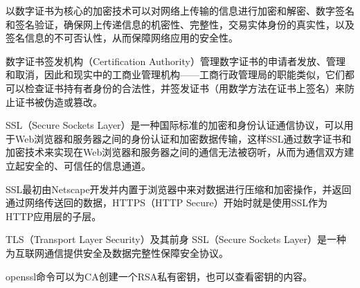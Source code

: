 以数字证书为核心的加密技术可以对网络上传输的信息进行加密和解密、数字签名和签名验证，确保网上传递信息的机密性、完整性，交易实体身份的真实性，以及签名信息的不可否认性，从而保障网络应用的安全性。

数字证书签发机构（Certification Authority）管理数字证书的申请者发放、管理和取消，因此和现实中的工商业管理机构——工商行政管理局的职能类似，它们都可以检查证书持有者身份的合法性，并签发证书（用数学方法在证书上签名）来防止证书被伪造或篡改。

SSL（Secure Sockets Layer）是一种国际标准的加密和身份认证通信协议，可以用于Web浏览器和服务器之间的身份认证和加密数据传输，这样SSL通过数字证书和加密技术来实现在Web浏览器和服务器之间的通信无法被窃听，从而为通信双方建立起安全的、可信任的信息通道。

SSL最初由Netscape开发并内置于浏览器中来对数据进行压缩和加密操作，并返回通过网络传送回的数据，HTTPS（HTTP Secure）开始时就是使用SSL作为HTTP应用层的子层。

TLS（Transport Layer Security）及其前身 SSL（Secure Sockets Layer）是一种为互联网通信提供安全及数据完整性保障安全协议。

openssl命令可以为CA创建一个RSA私有密钥，也可以查看密钥的内容。



